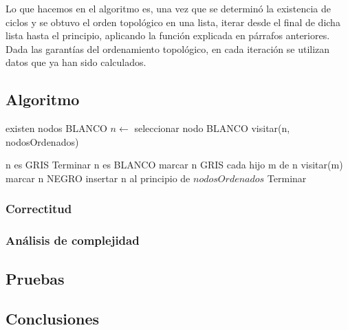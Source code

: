 \quad Lo que hacemos en el algoritmo es, una vez que se determinó la existencia de ciclos y se obtuvo el orden topológico en una lista, iterar desde el final de dicha lista hasta el principio, aplicando la función explicada en párrafos anteriores. Dada las garantías del ordenamiento topológico, en cada iteración se utilizan datos que ya han sido calculados.



 

\subsection{Algoritmo}

\begin{algorithm}[H]
\caption{} 
\begin{codebox}
\li \While existen nodos BLANCO \Do
\li	$n \gets$ seleccionar nodo BLANCO
\li	visitar(n, nodosOrdenados)

\End
\end{codebox}
\end{algorithm}


\begin{algorithm}[H]
\caption{} 
\begin{codebox}
\li \If n es GRIS 
\li 	 Terminar
\li \End
\li \If n es BLANCO \Do
\li	marcar n GRIS
\li	\For cada hijo m de n \Do
\li		visitar(m)			
\li	\End
\li	marcar n NEGRO
\li 	insertar n al principio de $nodosOrdenados$
\li 	 Terminar
\li \End

\End
\end{codebox}
\end{algorithm}
 

\subsubsection{Correctitud} 



\subsubsection{An\'alisis de complejidad}
 
 

\subsection{Pruebas}



\subsection{Conclusiones}
